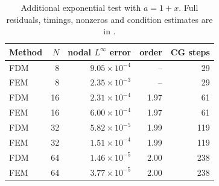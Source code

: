 \begin{table}[htbp]
\centering
\small
\setlength{\tabcolsep}{4pt}
\begin{tabular}{lrrrr}
\toprule
Method & $N$ & nodal $L^\infty$ error & order & CG steps \\
\midrule
FDM & 8 & $9.05\times10^{-4}$ & -- & 29 \\
FEM & 8 & $2.35\times10^{-3}$ & -- & 29 \\
FDM & 16 & $2.31\times10^{-4}$ & 1.97 & 61 \\
FEM & 16 & $6.00\times10^{-4}$ & 1.97 & 61 \\
FDM & 32 & $5.82\times10^{-5}$ & 1.99 & 119 \\
FEM & 32 & $1.51\times10^{-4}$ & 1.99 & 119 \\
FDM & 64 & $1.46\times10^{-5}$ & 2.00 & 238 \\
FEM & 64 & $3.77\times10^{-5}$ & 2.00 & 238 \\
\bottomrule
\end{tabular}
\caption{Additional exponential test with $a=1+x$. Full residuals, timings, nonzeros and condition estimates are in .}
\label{tab:variable-smooth}
\end{table}
